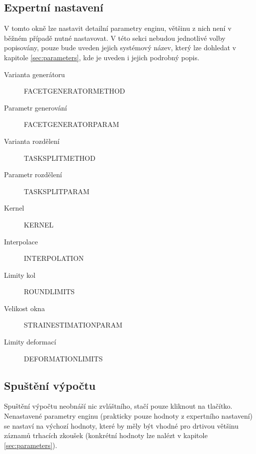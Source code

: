 \documentclass[a4paper,12pt]{article}
\begin{document}
\subsection{Expertní nastavení}
\begin{figure}[H]
\end{figure}
V tomto okně lze nastavit detailní parametry enginu, většinu z nich není v běžném případě nutné nastavovat. V této sekci nebudou jednotlivé volby popisovány, pouze bude uveden jejich systémový název, který lze dohledat v kapitole \ref{sec:parameters}, kde je uveden i jejich podrobný popis.
\begin{description}
\item[Varianta generátoru] FACET\textunderscore GENERATOR\textunderscore METHOD
\item[Parametr generování] FACET\textunderscore GENERATOR\textunderscore PARAM
\item[Varianta rozdělení] TASK\textunderscore SPLIT\textunderscore METHOD
\item[Parametr rozdělení] TASK\textunderscore SPLIT\textunderscore PARAM
\item[Kernel] KERNEL
\item[Interpolace] INTERPOLATION
\item[Limity kol] ROUND\textunderscore LIMITS
\item[Velikost okna] STRAIN\textunderscore ESTIMATION\textunderscore PARAM
\item[Limity deformací] DEFORMATION\textunderscore LIMITS 
\end{description}
\subsection{Spuštění výpočtu}
Spuštění výpočtu neobnáší nic zvláštního, stačí pouze kliknout na tlačítko. Nenastavené parametry enginu (prakticky pouze hodnoty z expertního nastavení) se nastaví na výchozí hodnoty, které by měly být vhodné pro drtivou většinu záznamů trhacích zkoušek (konkrétní hodnoty lze nalézt v kapitole \ref{sec:parameters}).
\end{document}
